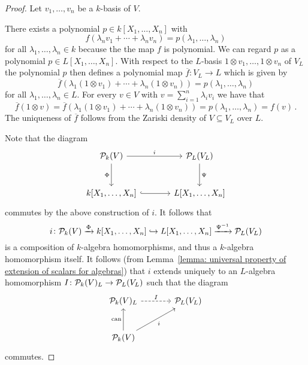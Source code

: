 \begin{proof}
    Let $v_1, \dotsc, v_n$ be a $k$-basis of $V$.
    
    There exists a polynomial $p \in k[X_1, \dotsc, X_n]$ with
    \[
        f(\lambda_n v_1 + \dotsb + \lambda_n v_n)
      = p(\lambda_1, \dotsc, \lambda_n)
    \]
    for all $\lambda_1, \dotsc, \lambda_n \in k$ because the the map $f$ is polynomial.
    We can regard $p$ as a polynomial $p \in L[X_1, \dotsc, X_n]$.
    With respect to the $L$-basis $1 \otimes v_1, \dotsc, 1 \otimes v_n$ of $V_L$ the polynomial $p$ then defines a polynomial map $\overline{f} \colon V_L \to L$ which is given by
    \[
        \overline{f}(\lambda_1 (1 \otimes v_1) + \dotsb + \lambda_n (1 \otimes v_n))
      = p(\lambda_1, \dotsc, \lambda_n)
    \]
    for all $\lambda_1, \dotsc, \lambda_n \in L$.
    For every $v \in V$ with $v = \sum_{i=1}^n \lambda_i v_i$ we have that
    \[
        \overline{f}(1 \otimes v)
      = \overline{f}(\lambda_1 (1 \otimes v_1) + \dotsb + \lambda_n (1 \otimes v_n))
      = p(\lambda_1, \dotsc, \lambda_n)
      = f(v) \,.
    \]
    The uniqueness of $\overline{f}$ follows from the Zariski density of $V \subseteq V_L$ over $L$.
    
    Note that the diagram
    \[
      \begin{tikzcd}[sep = large]
          \mc{P}_k(V)
          \arrow{r}[above]{i}
          \arrow{d}[left]{\Phi}
        & \mc{P}_L(V_L)
          \arrow{d}[right]{\Psi}
        \\
          k[X_1, \dotsc, X_n]
          \arrow[hook]{r}
        & L[X_1, \dotsc, X_n]
      \end{tikzcd}
    \]
    commutes by the above construction of $i$.
    It follows that
    \[
                              i
      \colon                  \mathcal{P}_k(V)
      \xrightarrow{\Phi}      k[X_1, \dotsc, X_n]
      \hookrightarrow         L[X_1, \dotsc, X_n]
      \xrightarrow{\Psi^{-1}} \mathcal{P}_L(V_L)
    \]
    is a composition of $k$-algebra homomorphisms, and thus a $k$-algebra homomorphism itself.
    It follows (from Lemma~\ref{lemma: universal property of extension of scalars for algebras}) that $i$ extends uniquely to an $L$-algebra homomorphism $I \colon \mathcal{P}_k(V)_L \to \mathcal{P}_L(V_L)$ such that the diagram
    \[
      \begin{tikzcd}[sep = large]
          \mc{P}_k(V)_L
          \arrow[dashed]{r}[above]{I}
        & \mc{P}_L(V_L)
        \\
          \mc{P}_k(V)
          \arrow{u}[left]{\can}
          \arrow{ru}[below right]{i}
        & {}
      \end{tikzcd}
    \]
    commutes.
    

\end{proof}
